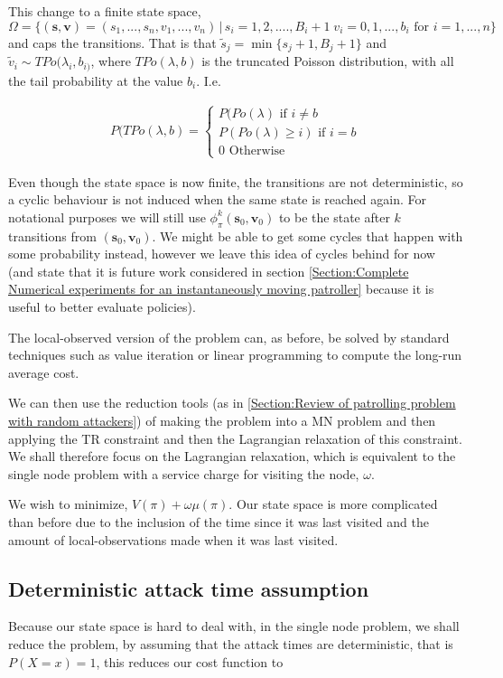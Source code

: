 \documentclass[a4paper,10pt]{article}
\theoremstyle{definition}
\theoremstyle{definition}
\theoremstyle{remark}
\theoremstyle{definition}
\begin{document}
This change to a finite state space, $\Omega = \{ (\bm{s},\bm{v})=(s_{1},...,s_{n},v_{1},...,v_{n}) \, | \, s_{i}=1,2,....,B_{i}+1 \; v_{i}=0,1,...,b_{i}  \text{ for } i=1,...,n\}$ and caps the transitions. That is that $\widetilde{s}_{j}= \min \{s_{j}+1, B_{j}+1 \}$ and $\widetilde{v}_{i} \sim TPo(\lambda_{i},b_{i)}$, where $TPo(\lambda,b)$ is the truncated Poisson distribution, with all the tail probability at the value $b_{i}$. I.e.

\begin{align*}
P(TPo(\lambda,b)=\begin{cases}
P(Po(\lambda) \text{ if } i \neq b \\
P(Po(\lambda) \geq i) \text{ if } i=b \\
0 \text{ Otherwise}
\end{cases}
\end{align*}

Even though the state space is now finite, the transitions are not deterministic, so a cyclic behaviour is not induced when the same state is reached again. For notational purposes we will still use $\phi^{k}_{\pi}(\bm{s}_{0},\bm{v}_{0})$ to be the state after $k$ transitions from $(\bm{s}_{0},\bm{v}_{0})$. We might be able to get some cycles that happen with some probability instead, however we leave this idea of cycles behind for now (and state that it is future work considered in section \ref{Section:Complete Numerical experiments for an instantaneously moving patroller} because it is useful to better evaluate policies).

The local-observed version of the problem can, as before, be solved by standard techniques such as value iteration or linear programming to compute the long-run average cost.

We can then use the reduction tools (as in \ref{Section:Review of patrolling problem with random attackers}) of making the problem into a MN problem and then applying the TR constraint and then the Lagrangian relaxation of this constraint. We shall therefore focus on the Lagrangian relaxation, which is equivalent to the single node problem with a service charge for visiting the node, $\omega$.

We wish to minimize, $V(\pi)+\omega \mu(\pi)$. Our state space is more complicated than before due to the inclusion of the time since it was last visited and the amount of local-observations made when it was last visited.

\subsection{Deterministic attack time assumption}
\label{Section:Deterministic attack time assumption}
Because our state space is hard to deal with, in the single node problem, we shall reduce the problem, by assuming that the attack times are deterministic, that is $P(X=x)=1$, this reduces our cost function to
\end{document}
